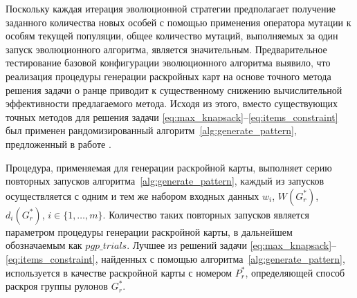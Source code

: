 \documentclass[12pt]{article}
\begin{document}
Поскольку каждая итерация эволюционной стратегии предполагает получение 
заданного количества новых особей с помощью применения оператора мутации к 
особям текущей популяции, общее количество мутаций, выполняемых за один запуск 
эволюционного алгоритма, является значительным. Предварительное тестирование 
базовой конфигурации эволюционного алгоритма выявило, что реализация процедуры 
генерации раскройных карт на основе точного метода решения задачи о ранце 
приводит к существенному снижению вычислительной эффективности предлагаемого 
метода. Исходя из этого, вместо существующих точных методов для решения задачи 
\eqref{eq:max_knapsack}--\eqref{eq:items_constraint} 
был применен рандомизированный алгоритм~\ref{alg:generate_pattern}, 
предложенный в работе 
\cite{vahrenkamp96}. 

Процедура, применяемая для генерации раскройной карты, выполняет серию 
повторных запусков алгоритма~\ref{alg:generate_pattern}, 
каждый из запусков осуществляется с одним и тем же набором входных 
данных $w_i$, $W(G_r^*)$, $d_i(G_r^*)$, $i \in \{1,\ldots,m\}$. Количество 
таких повторных запусков является параметром процедуры генерации раскройной 
карты, в дальнейшем обозначаемым как $pgp\_trials$. Лучшее из решений задачи 
\eqref{eq:max_knapsack}--\eqref{eq:items_constraint}, 
найденных с помощью алгоритма~\ref{alg:generate_pattern}, 
используется в качестве раскройной карты с номером $P_r^*$, определяющей 
способ раскроя группы рулонов $G_r^*$.
\end{document}
